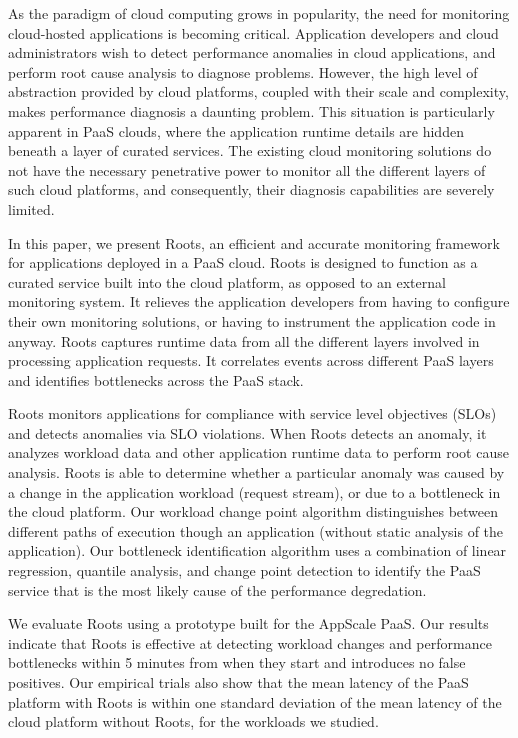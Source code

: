 As the paradigm of cloud computing grows in popularity, the need for monitoring cloud-hosted 
applications is becoming critical. Application developers and cloud administrators
wish to detect performance anomalies in cloud applications, and
perform root cause analysis to diagnose problems. However, the high level of abstraction provided by cloud
platforms, coupled with their scale and complexity, makes performance diagnosis
a daunting problem. This situation is particularly apparent in
PaaS clouds, where the application runtime details are hidden beneath a layer of curated services.
The existing cloud monitoring solutions do not have the necessary penetrative power
to monitor all the different layers of such cloud platforms, and consequently, their diagnosis
capabilities are severely limited.

In this paper, we present Roots, an efficient and accurate 
monitoring framework for applications deployed in a PaaS cloud. 
Roots is designed to function as a curated service
built into the cloud platform, as opposed to an external monitoring system. 
It relieves the application developers from having to configure
their own monitoring solutions, or having to instrument the application code in anyway.
Roots captures runtime data from all the different layers involved
in processing application requests. It correlates events across different PaaS layers and
identifies bottlenecks across the PaaS stack.

Roots monitors applications for compliance with service level objectives (SLOs) and detects anomalies via SLO violations.
When Roots detects an anomaly, 
it analyzes workload data and other application runtime data
to perform root cause analysis. Roots is able to determine whether a particular
anomaly was caused by a change in the application workload (request stream), or due to a bottleneck
in the cloud platform. 
Our workload change point algorithm
distinguishes between different paths
of execution though an application (without static analysis of the application).  Our bottleneck identification algorithm
uses a combination of linear regression, quantile analysis, 
and change point detection to identify the PaaS service that is 
the most likely cause of the performance degredation. 

We evaluate Roots using a prototype built for the AppScale PaaS. 
Our results indicate that Roots is effective at detecting 
workload changes and performance bottlenecks within 5 
minutes from when they start and introduces no false positives.
Our empirical trials also show that the mean latency of the 
PaaS platform with Roots is within one standard deviation of the mean
latency of the cloud platform without Roots, for the workloads we studied. 

